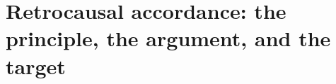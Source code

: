 \documentclass[11pt]{article}
\numberwithin{equation}{section}
\theoremstyle{plain}
\theoremstyle{definition}
\theoremstyle{remark}
\begin{document}
%

\section{Retrocausal accordance: the principle, the argument, and the
target}\label{ra:sec}
\end{document}

